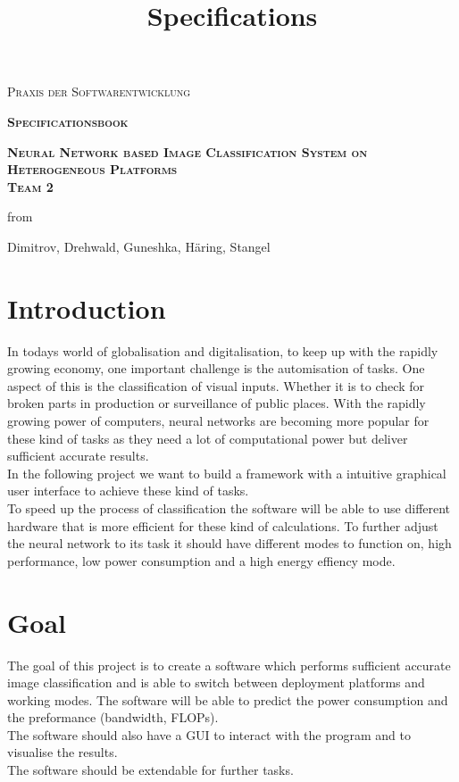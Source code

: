 \documentclass[parskip=full]{scrartcl}
\title{Specifications}
\author{}
\begin{document}
\renewcommand{\figurename}{Figure}
\begin{titlepage}
\centering
	\vspace{3cm}
	{\scshape\LARGE Praxis der Softwarentwicklung\par}
	\vspace{2cm}
	{\scshape\Huge\bfseries Specificationsbook \par}	
	\vspace{2cm}
	{\scshape\Huge\bfseries Neural Network based Image Classification System on Heterogeneous Platforms \\ Team 2 \par}
	\vspace{2cm}
	{\Large from \par}
	\vspace{0.25cm}
	{\Large Dimitrov, Drehwald, Guneshka, Häring, Stangel \par}
	\vfill
\end{titlepage}
\newpage
\tableofcontents
\newpage
\section{Introduction}
In todays world of globalisation and digitalisation, to keep up with the rapidly growing economy, one important challenge is the automisation of tasks. One aspect of this is the classification of visual inputs. Whether it is to check for broken parts in production or surveillance of public places. With the rapidly growing power of computers, neural networks are becoming more popular for these kind of tasks as they need a lot of computational power but deliver sufficient accurate results.\\
In the following project we want to build a framework with a intuitive graphical user interface to achieve these kind of tasks.\\
To speed up the process of classification the software will be able to use different hardware that is more efficient for these kind of calculations. To further adjust the neural network to its task it should have different modes to function on, high performance, low power consumption and a high energy effiency mode. \\


\section{Goal}
The goal of this project is to create a software which performs sufficient accurate image classification and is able to switch between deployment platforms and working modes. The software will be able to predict the power consumption and the preformance (bandwidth, FLOPs).\\
The software should also have a GUI to interact with the program and to visualise the results.\\
The software should be extendable for further tasks.
\end{document}
